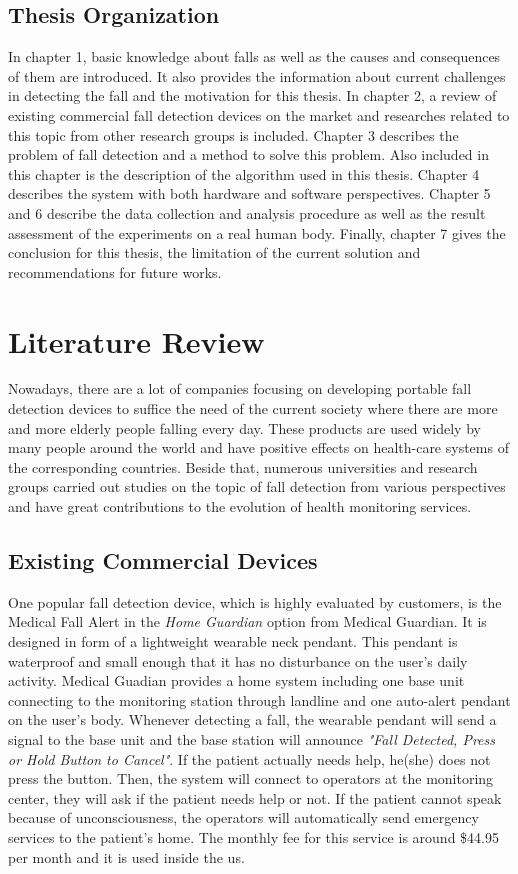 \documentclass[letterpaper,12pt,titlepage,oneside,final]{book}
\begin{document}
\section{Thesis Organization}
In chapter 1, basic knowledge about falls as well as the causes and consequences of them are introduced. It also provides the information about current challenges in detecting the fall and the motivation for this thesis. In chapter 2, a review of existing commercial fall detection devices on the market and researches related to this topic from  other research groups is included. Chapter 3 describes the problem of fall detection and a method to solve this problem. Also included in this chapter is the description of the algorithm used in this thesis. Chapter 4 describes the system with both hardware and software perspectives. Chapter 5 and 6 describe the data collection and analysis procedure as well as the result assessment of the experiments on a real human body. Finally, chapter 7 gives the conclusion for this thesis, the limitation of the current solution and recommendations for future works.
\chapter{Literature Review}
Nowadays, there are a lot of companies focusing on developing portable fall detection devices to suffice the need of the current society where there are more and more elderly people falling every day. These products are used widely by many people around the world and have positive effects on health-care systems of the corresponding countries. Beside that, numerous universities and research groups carried out studies on the topic of fall detection from various perspectives and have great contributions to the evolution of health monitoring services.  
\section{Existing Commercial Devices}
One popular fall detection device, which is highly evaluated by customers, is the Medical Fall Alert in the \textit{Home Guardian} option from Medical Guardian. It is designed in form of a lightweight wearable neck pendant. This pendant is waterproof and small enough that it has no disturbance on the user's daily activity. Medical Guadian provides a home system including one base unit connecting to the monitoring station through landline and one auto-alert pendant on the user's body. Whenever detecting a fall, the wearable pendant will send a signal to the base unit and the base station will announce \textit{"Fall Detected, Press or Hold Button to Cancel"}. If the patient actually needs help, he(she) does not press the button. Then, the system will connect to operators at the monitoring center, they will ask if the patient needs help or not. If the patient cannot speak because of unconsciousness, the operators will automatically send emergency services to the patient's home. The monthly fee for this service is around \$44.95 per month and it is used inside the \gls{us}.
\end{document}
